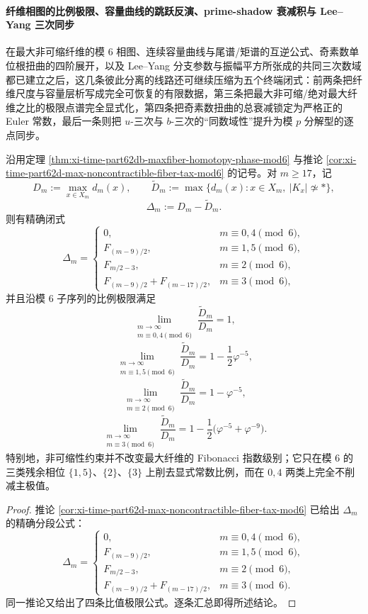 \paragraph{纤维相图的比例极限、容量曲线的跳跃反演、prime-shadow 衰减积与 Lee--Yang 三次同步}
在最大非可缩纤维的模 \(6\) 相图、连续容量曲线与尾谱/矩谱的互逆公式、奇素数单位根扭曲的四阶展开，以及 Lee--Yang 分支参数与振幅平方所张成的共同三次数域都已建立之后，这几条彼此分离的线路还可继续压缩为五个终端闭式：前两条把纤维尺度与容量层析写成完全可恢复的有限数据，第三条把最大非可缩/绝对最大纤维之比的极限点谱完全显式化，第四条把奇素数扭曲的总衰减锁定为严格正的 Euler 常数，最后一条则把 \(u\)-三次与 \(b\)-三次的“同数域性”提升为模 \(p\) 分解型的逐点同步。

\begin{theorem}\label{thm:xi-time-part62df-maxfiber-gap-ratio-limit}
沿用定理 \ref{thm:xi-time-part62db-maxfiber-homotopy-phase-mod6} 与推论 \ref{cor:xi-time-part62d-max-noncontractible-fiber-tax-mod6} 的记号。对 \(m\ge 17\)，记
\[
D_m:=\max_{x\in X_m}d_m(x),
\qquad
\widetilde D_m:=\max\{d_m(x):x\in X_m,\ |K_x|\not\simeq *\},
\]
\[
\Delta_m:=D_m-\widetilde D_m.
\]
则有精确闭式
\[
\Delta_m=
\begin{cases}
0,& m\equiv 0,4\pmod 6,\\[2mm]
F_{(m-9)/2},& m\equiv 1,5\pmod 6,\\[2mm]
F_{m/2-3},& m\equiv 2\pmod 6,\\[2mm]
F_{(m-9)/2}+F_{(m-17)/2},& m\equiv 3\pmod 6,
\end{cases}
\]
并且沿模 \(6\) 子序列的比例极限满足
\[
\lim_{\substack{m\to\infty\\ m\equiv 0,4\!\!\!\!\pmod 6}}
\frac{\widetilde D_m}{D_m}=1,
\]
\[
\lim_{\substack{m\to\infty\\ m\equiv 1,5\!\!\!\!\pmod 6}}
\frac{\widetilde D_m}{D_m}
=
1-\frac{1}{2}\varphi^{-5},
\]
\[
\lim_{\substack{m\to\infty\\ m\equiv 2\!\!\!\!\pmod 6}}
\frac{\widetilde D_m}{D_m}
=
1-\varphi^{-5},
\]
\[
\lim_{\substack{m\to\infty\\ m\equiv 3\!\!\!\!\pmod 6}}
\frac{\widetilde D_m}{D_m}
=
1-\frac{1}{2}\bigl(\varphi^{-5}+\varphi^{-9}\bigr).
\]
特别地，非可缩性约束并不改变最大纤维的 Fibonacci 指数级别；它只在模 \(6\) 的三类残余相位 \(\{1,5\}\)、\(\{2\}\)、\(\{3\}\) 上削去显式常数比例，而在 \(0,4\) 两类上完全不削减主极值。
\end{theorem}
\begin{proof}
推论 \ref{cor:xi-time-part62d-max-noncontractible-fiber-tax-mod6} 已给出 \(\Delta_m\) 的精确分段公式：
\[
\Delta_m=
\begin{cases}
0,& m\equiv 0,4\pmod 6,\\[1mm]
F_{(m-9)/2},& m\equiv 1,5\pmod 6,\\[1mm]
F_{m/2-3},& m\equiv 2\pmod 6,\\[1mm]
F_{(m-9)/2}+F_{(m-17)/2},& m\equiv 3\pmod 6.
\end{cases}
\]
同一推论又给出了四条比值极限公式。逐条汇总即得所述结论。
\end{proof}

